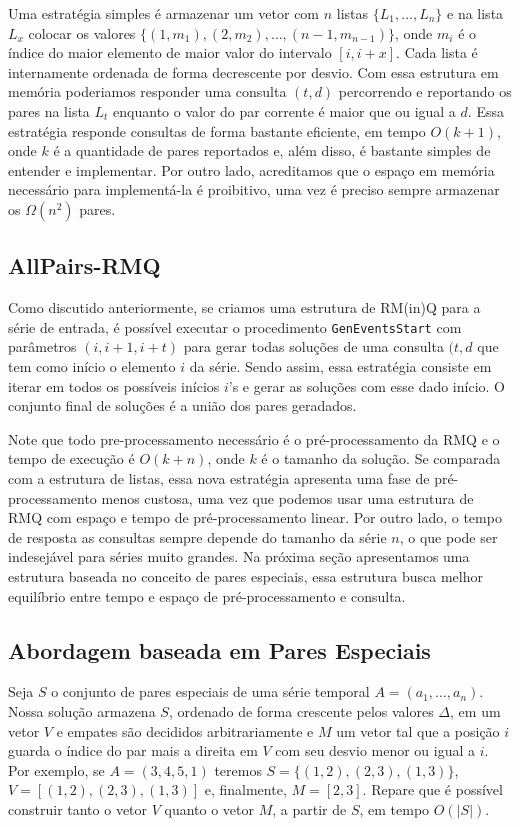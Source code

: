 \documentclass[12pt]{article}
\begin{document}
Uma estratégia simples é armazenar um vetor com $n$ listas $\{L_1, \ldots, L_n\}$ e na lista $L_x$ colocar os valores $\{(1, m_1), (2, m_2), \ldots, (n-1, m_{n-1})\}$, onde $m_i$ é o índice do maior elemento de maior valor do intervalo $[i, i + x]$. Cada lista é internamente ordenada de forma decrescente por desvio. Com essa estrutura em memória poderiamos responder uma consulta $(t, d)$ percorrendo e reportando os pares na lista $L_t$ enquanto o valor do par corrente é maior que ou igual a $d$. Essa estratégia responde consultas de forma bastante eficiente, em tempo $O(k + 1)$, onde $k$ é a quantidade de pares reportados e, além disso, é bastante simples de entender e implementar. Por outro lado, acreditamos que o espaço em memória necessário para implementá-la é proibitivo, uma vez é preciso sempre armazenar 
os $\Omega(n^2)$ pares.  

\subsection{AllPairs-RMQ}

Como discutido anteriormente, se criamos uma estrutura de RM(in)Q para a série
de entrada, é possível executar o procedimento {\tt GenEventsStart} com parâmetros
$(i, i + 1, i + t)$ para gerar todas soluções de uma consulta $(t, d$ que tem como
início o elemento $i$ da série. Sendo assim, essa estratégia consiste em iterar 
em todos os possíveis inícios $i$'s e gerar as soluções com esse dado início. 
O conjunto final de soluções é a união dos pares geradados. 

Note que todo pre-processamento necessário é o pré-processamento
da RMQ e o tempo de execução é $O(k + n)$, onde $k$ é o tamanho da solução.
Se comparada com a estrutura de listas, essa nova estratégia apresenta uma
fase de pré-processamento menos custosa, uma vez que podemos usar uma
estrutura de RMQ com espaço e tempo de pré-processamento linear. Por outro lado,
o tempo de resposta as consultas sempre depende do tamanho da série $n$, o que
pode ser indesejável para séries muito grandes. Na próxima seção apresentamos
uma estrutura baseada no conceito de pares especiais, essa estrutura busca
melhor equilíbrio entre tempo e espaço de pré-processamento e consulta. 

\subsection{Abordagem baseada em Pares Especiais}

Seja $S$ o conjunto de pares especiais de uma série temporal $A = (a_1, \ldots, a_n)$. 
Nossa solução armazena $S$, ordenado de forma crescente pelos valores $\Delta$, em 
um vetor $V$ e empates são decididos arbitrariamente e $M$ um vetor tal que a posição
$i$ guarda o índice do par mais a direita em $V$ com seu desvio menor ou igual a $i$.
Por exemplo, se $A = (3, 4, 5, 1)$ teremos $S = \{(1, 2), (2, 3), (1, 3)\}$,
$V = [(1, 2), (2, 3), (1, 3)]$ e, finalmente, $M = [2, 3]$. Repare que é possível construir
tanto o vetor $V$ quanto o vetor $M$, a partir de $S$, em tempo $O(|S|)$.
\end{document}
